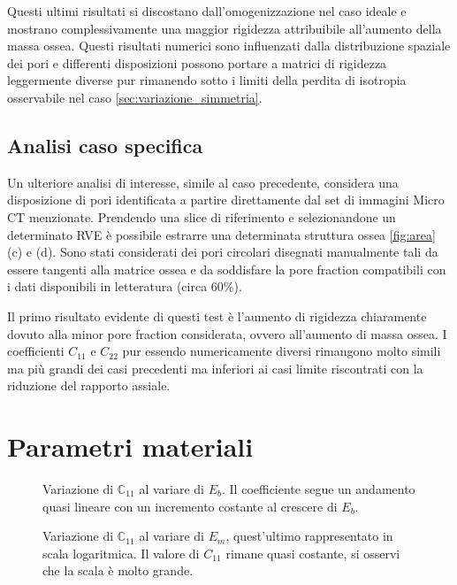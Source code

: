 \documentclass[a4paper,num-refs]{oup-contemporary}
\begin{document}
Questi ultimi risultati si discostano dall'omogenizzazione nel caso ideale e mostrano complessivamente una maggior rigidezza attribuibile all'aumento della massa ossea. Questi risultati numerici sono influenzati dalla distribuzione spaziale dei pori e differenti disposizioni possono portare a matrici di rigidezza leggermente diverse pur rimanendo sotto i limiti della perdita di isotropia osservabile nel caso \cref{sec:variazione_simmetria}.


\subsection{Analisi caso specifica}
\label{sec:caso_spec}
Un ulteriore analisi di interesse, simile al caso precedente, considera una disposizione di pori identificata a partire direttamente dal set di immagini Micro CT menzionate. Prendendo una slice di riferimento e selezionandone un determinato RVE è possibile estrarre una determinata struttura ossea \cref{fig:area} (c) e (d). Sono stati considerati dei pori circolari disegnati manualmente tali da essere tangenti alla matrice ossea e da soddisfare la pore fraction compatibili con i dati disponibili in letteratura (circa 60\%). 

Il primo risultato evidente di questi test è l'aumento di rigidezza chiaramente dovuto alla minor pore fraction considerata, ovvero all'aumento di massa ossea.  I coefficienti $C_{11}$ e $C_{22}$ pur essendo numericamente diversi rimangono molto simili ma più grandi dei casi precedenti ma inferiori ai casi limite riscontrati con la riduzione del rapporto assiale.

\section{Parametri materiali}
\label{sec:variazioni_materiali}

\begin{figure}[bt!] %
	\centering
	\def\svgwidth{0.9\linewidth}
	
	\caption{Variazione di $\mathbb C_{11}$ al variare di $E_b$. Il coefficiente segue un andamento quasi lineare con un incremento costante al crescere di $E_b$.}\label{fig:var_Ebone}
\end{figure}

\begin{figure}[bt!] %
	\centering
	\def\svgwidth{0.9\linewidth}
	
	\caption{Variazione di $\mathbb C_{11}$ al variare di $E_m$, quest'ultimo rappresentato in scala logaritmica. Il valore di $C_{11}$ rimane quasi costante, si osservi che la scala è molto grande.}\label{fig:var_Emarrow}
\end{figure}
\end{document}
